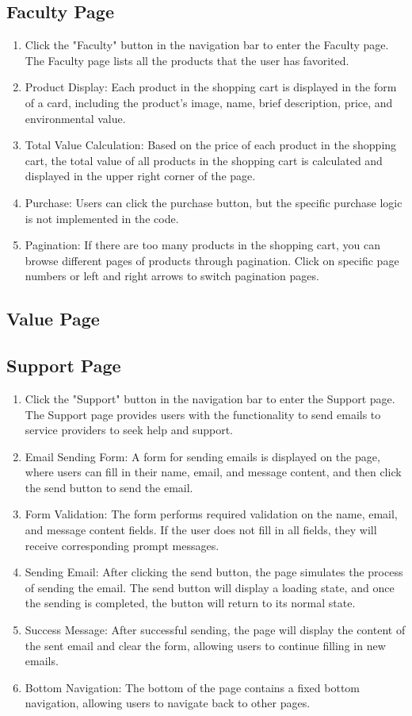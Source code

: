 \documentclass{article}
\begin{document}
\subsection{Faculty Page}
\begin{enumerate}
    \item Click the "Faculty" button in the navigation bar to enter the Faculty page. The Faculty page lists all the products that the user has favorited.
    \item Product Display: Each product in the shopping cart is displayed in the form of a card, including the product's image, name, brief description, price, and environmental value.
    \item Total Value Calculation: Based on the price of each product in the shopping cart, the total value of all products in the shopping cart is calculated and displayed in the upper right corner of the page.
    \item Purchase: Users can click the purchase button, but the specific purchase logic is not implemented in the code.
    \item Pagination: If there are too many products in the shopping cart, you can browse different pages of products through pagination. Click on specific page numbers or left and right arrows to switch pagination pages.
\end{enumerate}

\subsection{Value Page}

\subsection{Support Page}
\begin{enumerate}
    \item Click the "Support" button in the navigation bar to enter the Support page. The Support page provides users with the functionality to send emails to service providers to seek help and support.
    \item Email Sending Form: A form for sending emails is displayed on the page, where users can fill in their name, email, and message content, and then click the send button to send the email.
    \item Form Validation: The form performs required validation on the name, email, and message content fields. If the user does not fill in all fields, they will receive corresponding prompt messages.
    \item Sending Email: After clicking the send button, the page simulates the process of sending the email. The send button will display a loading state, and once the sending is completed, the button will return to its normal state.
    \item Success Message: After successful sending, the page will display the content of the sent email and clear the form, allowing users to continue filling in new emails.
    \item Bottom Navigation: The bottom of the page contains a fixed bottom navigation, allowing users to navigate back to other pages.
\end{enumerate}
\end{document}
